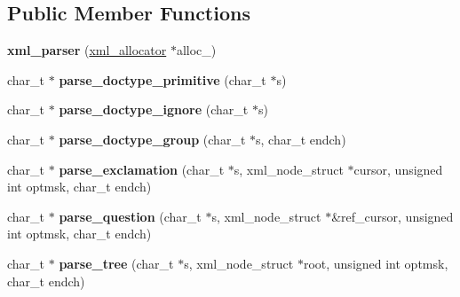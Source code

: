\subsection*{Public Member Functions}
\begin{DoxyCompactItemize}
\item 
\hypertarget{structxml__parser_a062d6951738847e674b538a677c8c5f0}{{\bfseries xml\+\_\+parser} (\hyperlink{structxml__allocator}{xml\+\_\+allocator} $\ast$alloc\+\_\+)}\label{structxml__parser_a062d6951738847e674b538a677c8c5f0}

\item 
\hypertarget{structxml__parser_a722853b603ad9a1d1f61bb8115bea5b4}{char\+\_\+t $\ast$ {\bfseries parse\+\_\+doctype\+\_\+primitive} (char\+\_\+t $\ast$s)}\label{structxml__parser_a722853b603ad9a1d1f61bb8115bea5b4}

\item 
\hypertarget{structxml__parser_a1e996ac9c9993f1939128859596376a1}{char\+\_\+t $\ast$ {\bfseries parse\+\_\+doctype\+\_\+ignore} (char\+\_\+t $\ast$s)}\label{structxml__parser_a1e996ac9c9993f1939128859596376a1}

\item 
\hypertarget{structxml__parser_a7804219124faeee80c00a967d16f23e3}{char\+\_\+t $\ast$ {\bfseries parse\+\_\+doctype\+\_\+group} (char\+\_\+t $\ast$s, char\+\_\+t endch)}\label{structxml__parser_a7804219124faeee80c00a967d16f23e3}

\item 
\hypertarget{structxml__parser_a40da52e4b27a0a06752930a0edf16fe9}{char\+\_\+t $\ast$ {\bfseries parse\+\_\+exclamation} (char\+\_\+t $\ast$s, xml\+\_\+node\+\_\+struct $\ast$cursor, unsigned int optmsk, char\+\_\+t endch)}\label{structxml__parser_a40da52e4b27a0a06752930a0edf16fe9}

\item 
\hypertarget{structxml__parser_a2b0edc4fbf2ff448b4d5b31593c5c4fd}{char\+\_\+t $\ast$ {\bfseries parse\+\_\+question} (char\+\_\+t $\ast$s, xml\+\_\+node\+\_\+struct $\ast$\&ref\+\_\+cursor, unsigned int optmsk, char\+\_\+t endch)}\label{structxml__parser_a2b0edc4fbf2ff448b4d5b31593c5c4fd}

\item 
\hypertarget{structxml__parser_a96e76ebea8834b3e56e1c8646e593da4}{char\+\_\+t $\ast$ {\bfseries parse\+\_\+tree} (char\+\_\+t $\ast$s, xml\+\_\+node\+\_\+struct $\ast$root, unsigned int optmsk, char\+\_\+t endch)}\label{structxml__parser_a96e76ebea8834b3e56e1c8646e593da4}

\end{DoxyCompactItemize}
